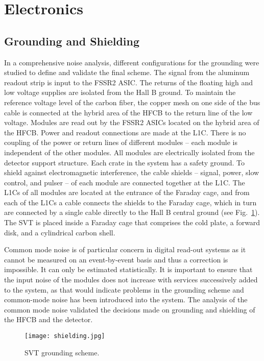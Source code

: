 \section{Electronics}

\subsection{Grounding and Shielding}

In a comprehensive noise analysis, different configurations for the grounding were studied to define and validate the final scheme. The signal from the aluminum readout strip is input to the FSSR2 ASIC. The returns of the floating high and low voltage supplies are isolated from the Hall B ground. To maintain the reference voltage level of the carbon fiber, the copper mesh on one side of the bus cable is connected at the hybrid area of the HFCB to the return line of the low voltage. Modules are read out by the FSSR2 ASICs located on the hybrid area of the HFCB. Power and readout connections are made at the L1C. There is no coupling of the power or return lines of different modules -- each module is independent of the other modules. All modules are electrically isolated from the detector support structure. Each crate in the system has a safety ground. To shield against electromagnetic interference, the cable shields -- signal, power, slow control, and pulser -- of each module are connected together at the L1C. The L1Cs of all modules are located at the entrance of the Faraday cage, and from each of the L1Cs a cable connects the shields to the Faraday cage, which in turn are connected by a single cable directly to the Hall B central ground (see Fig.~\ref{fig:shielding}). The SVT is placed inside a Faraday cage that comprises the cold plate, a forward disk, and a cylindrical carbon shell. 

Common mode noise is of particular concern in digital read-out systems as it cannot be measured on an event-by-event basis and thus a correction is impossible. It can only be estimated statistically. It is important to ensure that the input noise of the modules does not increase with services successively added to the system, as that would indicate problems in the grounding scheme and common-mode noise has been introduced into the system. The analysis of the common mode noise validated the decisions made on grounding and shielding of the HFCB and the detector.

\begin{figure}[hbt] 
\centering 
\texttt{[image: shielding.jpg]}
\caption{SVT grounding scheme.}
\label{fig:shielding}
\end{figure}

